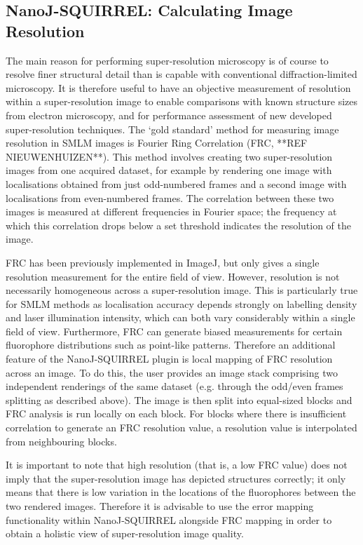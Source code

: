 \subsection*{NanoJ-SQUIRREL: Calculating Image Resolution}
The main reason for performing super-resolution microscopy is of course to resolve finer structural detail than is capable with conventional diffraction-limited microscopy. It is therefore useful to have an objective measurement of resolution within a super-resolution image to enable comparisons with known structure sizes from electron microscopy, and for performance assessment of new developed super-resolution techniques. The `gold standard' method for measuring image resolution in SMLM images is Fourier Ring Correlation (FRC, **REF NIEUWENHUIZEN**). This method involves creating two super-resolution images from one acquired dataset, for example by rendering one image with localisations obtained from just odd-numbered frames and a second image with localisations from even-numbered frames. The correlation between these two images is measured at different frequencies in Fourier space; the frequency at which this correlation drops below a set threshold indicates the resolution of the image.

FRC has been previously implemented in ImageJ, but only gives a single resolution measurement for the entire field of view. However, resolution is not necessarily homogeneous across a super-resolution image. This is particularly true for SMLM methods as localisation accuracy depends strongly on labelling density and laser illumination intensity, which can both vary considerably within a single field of view. Furthermore, FRC can generate biased measurements for certain fluorophore distributions such as point-like patterns. Therefore an additional feature of the NanoJ-SQUIRREL plugin is local mapping of FRC resolution across an image. To do this, the user provides an image stack comprising two independent renderings of the same dataset (e.g. through the odd/even frames splitting as described above). The image is then split into equal-sized blocks and FRC analysis is run locally on each block. For blocks where there is insufficient correlation to generate an FRC resolution value, a resolution value is interpolated from neighbouring blocks.

It is important to note that high resolution (that is, a low FRC value) does not imply that the super-resolution image has depicted structures correctly; it only means that there is low variation in the locations of the fluorophores between the two rendered images. Therefore it is advisable to use the error mapping functionality within NanoJ-SQUIRREL alongside FRC mapping in order to obtain a holistic view of super-resolution image quality.


